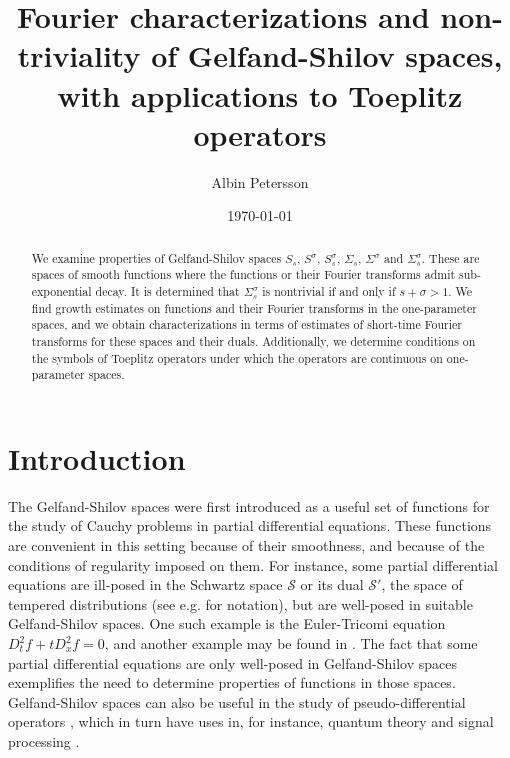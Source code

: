 \documentclass[11pt,a4paper,reqno]{amsart}
\title{Fourier characterizations and non-triviality of Gelfand-Shilov spaces, with applications to Toeplitz operators}
\author{Albin Petersson}
\date{\today}
\numberwithin{equation}{section}
\theoremstyle{definition}
\theoremstyle{definition}
\begin{document}
\begin{abstract}
    We examine properties of Gelfand-Shilov spaces $S_s$, $S^\sigma$, $S_s^\sigma$,  $\Sigma_s$, $\Sigma^\sigma$ and $\Sigma_s^\sigma$. These are spaces of smooth functions where the functions or their Fourier transforms admit sub-exponential decay. It is determined that $\Sigma_s^\sigma$ is nontrivial if and only if $s+\sigma > 1$. We find growth estimates on functions and their Fourier transforms in the one-parameter spaces, and we obtain characterizations in terms of estimates of short-time Fourier transforms for these spaces and their duals. Additionally, we determine conditions on the symbols of Toeplitz operators under which the operators are continuous on one-parameter spaces.
\end{abstract}
\maketitle

\section{Introduction}\label{sec:intro}
The Gelfand-Shilov spaces were first introduced as a useful set of functions for the study of Cauchy problems in partial differential equations. These functions are convenient in this setting because of their smoothness, and because of the conditions of regularity imposed on them. For instance, some partial differential equations are ill-posed in the Schwartz space $\mathscr{S}$ or its dual $\mathscr{S}'$, the space of tempered distributions (see e.g. \cite[p.~160-163]{hormander} for notation), but are well-posed in suitable Gelfand-Shilov spaces. One such example is the Euler-Tricomi equation $D_t^2 f + t D_x^2 f = 0$, and another example may be found in \cite{lewy}. The fact that some partial differential equations are only well-posed in Gelfand-Shilov spaces exemplifies the need to determine properties of functions in those spaces. Gelfand-Shilov spaces can also be useful in the study of pseudo-differential operators \cite{cappiello}, which in turn have uses in, for instance, quantum theory \cite{quantum} and signal processing \cite{signal}.
\end{document}
